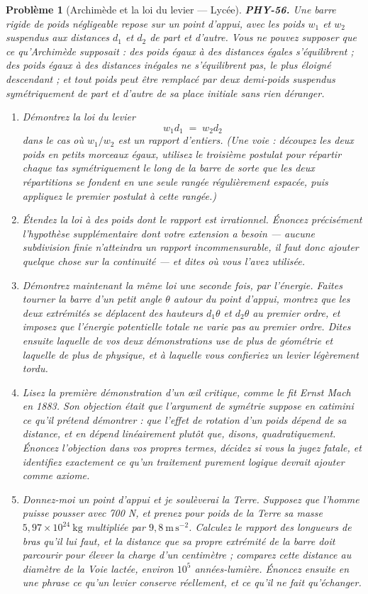 \documentclass[11pt]{article}
\newtheorem{problem}{Problème}
\begin{document}
\begin{problem}[{Archimède et la loi du levier --- Lycée}]
\textbf{PHY-56.} Une barre rigide de poids négligeable repose sur un point d'appui, avec les poids
$ w_{1} $ et $ w_{2} $ suspendus aux distances $ d_{1} $ et $ d_{2} $ de part et d'autre. Vous
ne pouvez supposer que ce qu'Archimède supposait : des poids égaux à des distances égales
s'équilibrent ; des poids égaux à des distances inégales ne s'équilibrent pas, le plus éloigné
descendant ; et tout poids peut être remplacé par deux demi-poids suspendus symétriquement de part et
d'autre de sa place initiale sans rien déranger.
\begin{enumerate}
\item[(a)] Démontrez la loi du levier
\[ w_{1} d_{1} \;=\; w_{2} d_{2} \]
dans le cas où $ w_{1}/w_{2} $ est un rapport d'entiers. (Une voie : découpez les deux poids en
petits morceaux égaux, utilisez le troisième postulat pour répartir chaque tas symétriquement le long
de la barre de sorte que les deux répartitions se fondent en une seule rangée régulièrement espacée,
puis appliquez le premier postulat à cette rangée.)
\item[(b)] Étendez la loi à des poids dont le rapport est irrationnel. Énoncez précisément l'hypothèse
supplémentaire dont votre extension a besoin --- aucune subdivision finie n'atteindra un rapport
incommensurable, il faut donc ajouter quelque chose sur la continuité --- et dites où vous l'avez
utilisée.
\item[(c)] Démontrez maintenant la même loi une seconde fois, par l'énergie. Faites tourner la barre d'un
petit angle $ \theta $ autour du point d'appui, montrez que les deux extrémités se déplacent des
hauteurs $ d_{1}\theta $ et $ d_{2}\theta $ au premier ordre, et imposez que l'énergie
potentielle totale ne varie pas au premier ordre. Dites ensuite laquelle de vos deux démonstrations
use de plus de géométrie et laquelle de plus de physique, et à laquelle vous confieriez un levier
légèrement tordu.
\item[(d)] Lisez la première démonstration d'un \oe{}il critique, comme le fit Ernst Mach en 1883. Son objection
était que l'argument de symétrie suppose en catimini ce qu'il prétend démontrer : que l'effet de
rotation d'un poids dépend de sa distance, et en dépend linéairement plutôt que, disons,
quadratiquement. Énoncez l'objection dans vos propres termes, décidez si vous la jugez fatale, et
identifiez exactement ce qu'un traitement purement logique devrait ajouter comme axiome.
\item[(e)] \og{} Donnez-moi un point d'appui et je soulèverai la Terre. \fg{} Supposez que l'homme puisse pousser
avec 700 N, et prenez pour poids de la Terre sa masse $ 5{,}97\times10^{24}\ \mathrm{kg} $
multipliée par $ 9{,}8\ \mathrm{m\,s^{-2}} $. Calculez le rapport des longueurs de bras qu'il lui
faut, et la distance que sa propre extrémité de la barre doit parcourir pour élever la charge d'un
centimètre ; comparez cette distance au diamètre de la Voie lactée, environ $ 10^{5} $
années-lumière. Énoncez ensuite en une phrase ce qu'un levier conserve réellement, et ce qu'il ne
fait qu'échanger.
\end{enumerate}


\end{problem}
\end{document}
